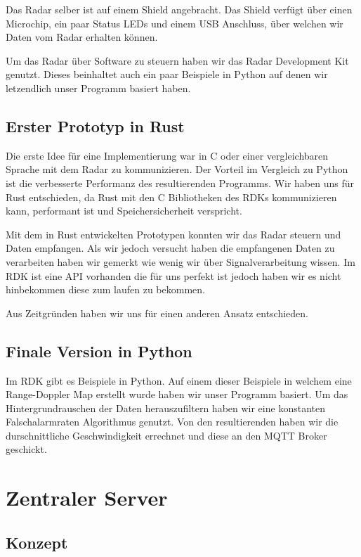 \documentclass[report]{scrartcl}
\begin{document}
Das Radar selber ist auf einem Shield angebracht. Das Shield verfügt über einen
Microchip, ein paar Status LEDs und einem USB Anschluss, über welchen wir Daten
vom Radar erhalten können.

Um das Radar über Software zu steuern haben wir das Radar Development Kit
genutzt. Dieses beinhaltet auch ein paar Beispiele in Python auf denen wir
letzendlich unser Programm basiert haben.

\subsection{Erster Prototyp in Rust}

Die erste Idee für eine Implementierung war in C oder einer vergleichbaren
Sprache mit dem Radar zu kommunizieren. Der Vorteil im Vergleich zu Python ist
die verbesserte Performanz des resultierenden Programms. Wir haben uns für Rust
entschieden, da Rust mit den C Bibliotheken des RDKs kommunizieren kann,
performant ist und Speichersicherheit verspricht.

Mit dem in Rust entwickelten Prototypen konnten wir das Radar steuern und Daten
empfangen. Als wir jedoch versucht haben die empfangenen Daten zu verarbeiten
haben wir gemerkt wie wenig wir über Signalverarbeitung wissen. Im RDK ist eine
API vorhanden die für uns perfekt ist jedoch haben wir es nicht hinbekommen
diese zum laufen zu bekommen.

Aus Zeitgründen haben wir uns für einen anderen Ansatz entschieden.

\subsection{Finale Version in Python}

Im RDK gibt es Beispiele in Python. Auf einem dieser Beispiele in welchem eine
Range-Doppler Map erstellt wurde haben wir unser Programm basiert.
Um das Hintergrundrauschen der Daten herauszufiltern haben wir eine konstanten
Falschalarmraten Algorithmus genutzt. Von den resultierenden haben wir die
durschnittliche Geschwindigkeit errechnet und diese an den MQTT
Broker geschickt.

\section{Zentraler Server}

\subsection{Konzept}
\end{document}
